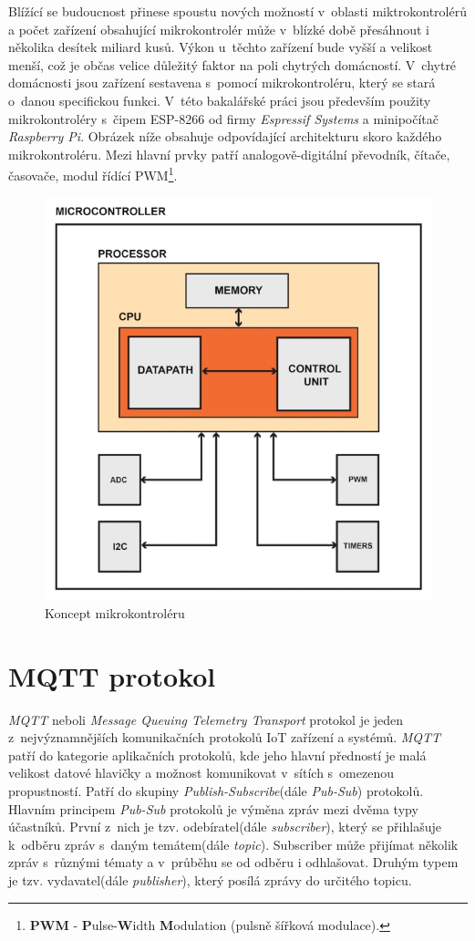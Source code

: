 Blížící se budoucnost přinese spoustu nových možností v~oblasti miktrokontrolérů a počet zařízení obsahující mikrokontrolér může v~blízké době přesáhnout i několika desítek miliard kusů.
Výkon u~těchto zařízení bude vyšší a velikost menší, což je občas velice důležitý faktor na poli chytrých domácností.
V~chytré domácnosti jsou zařízení sestavena s~pomocí mikrokontroléru, který se stará o~danou specifickou funkci. V~této bakalářské práci jsou především použity mikrokontroléry s~čipem ESP-8266 od firmy \emph{Espressif Systems}
a minipočítač \emph{Raspberry Pi}. Obrázek níže obsahuje odpovídající architekturu skoro každého mikrokontroléru.
Mezi hlavní prvky patří analogově-digitální převodník, čítače, časovače, modul řídící PWM\footnote{\textbf{PWM} - \textbf{P}ulse-\textbf{W}idth \textbf{M}odulation (pulsně šířková modulace).}.

\begin{figure}[hbt]
  \centering
  \includegraphics[width=.6 \linewidth]{obrazky-figures/mcu.jpeg}
  \caption{
    Koncept mikrokontroléru
  }
  \label{figure:mcu}
\end{figure}

\newpage

\section{MQTT protokol}
\label{terminy:mqtt}

\emph{MQTT} neboli \emph{Message Queuing Telemetry Transport} protokol je jeden z~nejvýznamnějších komunikačních protokolů IoT zařízení a systémů.
\emph{MQTT} patří do kategorie aplikačních protokolů, kde jeho hlavní předností je malá velikost datové hlavičky a možnost komunikovat v~sítích s~omezenou propustností.
Patří do skupiny \emph{Publish-Subscribe}(dále \emph{Pub-Sub}) protokolů.
Hlavním principem \emph{Pub-Sub} protokolů je výměna zpráv mezi dvěma typy účastníků. První z~nich je tzv. odebíratel(dále \emph{subscriber}),
který se přihlašuje k~odběru zpráv s~daným temátem(dále \emph{topic}).
Subscriber může přijímat několik zpráv s~různými tématy a v~průběhu se od odběru i odhlašovat. Druhým typem je tzv. vydavatel(dále \emph{publisher}), který posílá zprávy do určitého
topicu.~\cite{mqtt:info}

